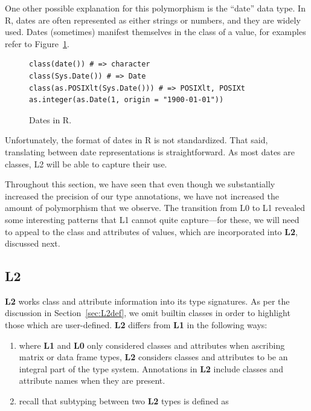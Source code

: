 \documentclass[acmsmall,10pt,review,anonymous]{acmart}\settopmatter{printfolios=true,printccs=false,printacmref=false}
\begin{document}
One other possible explanation for this polymorphism is the ``date'' data type.
In R, dates are often represented as either strings or numbers, and they are widely used.
Dates (sometimes) manifest themselves in the class of a value, for examples refer to Figure~\ref{fig:date}.
\begin{figure}[!hb]{\small\begin{lstlisting}[style=R]
class(date()) # => character
class(Sys.Date()) # => Date
class(as.POSIXlt(Sys.Date())) # => POSIXlt, POSIXt
as.integer(as.Date(1, origin = "1900-01-01"))
\end{lstlisting}}\caption{Dates in R.}\label{fig:date}\end{figure}

Unfortunately, the format of dates in R is not standardized.
That said, translating between date representations is straightforward.
As most dates are classes, L2 will be able to capture their use.

Throughout this section, we have seen that even though we substantially
increased the precision of our type annotations, we have not increased the
amount of polymorphism that we observe.  The transition from L0 to L1
revealed some interesting patterns that L1 cannot quite capture---for these,
we will need to appeal to the class and attributes of values, which are
incorporated into {\bf L2}, discussed next.

%
%
%
%
\subsection{L2}

{\bf L2} works class and attribute information into its type signatures.
As per the discussion in Section~\ref{sec:L2def}, we omit builtin classes in order to highlight those which are user-defined.
{\bf L2} differs from {\bf L1} in the following ways:

\begin{enumerate}

	\item where {\bf L1} and {\bf L0} only considered classes and attributes when ascribing matrix or data frame types, {\bf L2} considers classes and attributes to be an integral part of the type system.
	Annotations in {\bf L2} include classes and attribute names when they are present.
	
	\item recall that subtyping between two {\bf L2} types is defined as 
	
\end{enumerate}
\end{document}
